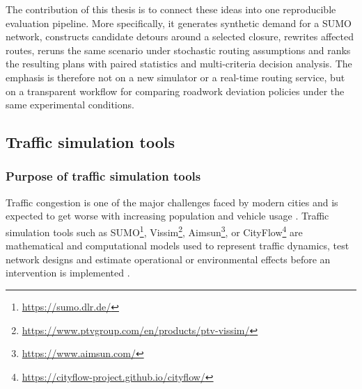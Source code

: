 The contribution of this thesis is to connect these ideas into one reproducible evaluation
pipeline. More specifically, it generates synthetic demand for a SUMO network, constructs candidate
detours around a selected closure, rewrites affected routes, reruns the same scenario under
stochastic routing assumptions and ranks the resulting plans with paired statistics and
multi-criteria decision analysis. The emphasis is therefore not on a new simulator or a real-time
routing service, but on a transparent workflow for comparing roadwork deviation policies under the
same experimental conditions.

\subsection{Traffic simulation tools}
\subsubsection{Purpose of traffic simulation tools}
Traffic congestion is one of the major challenges faced by modern cities and is expected to get
worse with increasing population and vehicle usage \cite{increasing_traffic,increasing_cars}.
Traffic simulation tools such as SUMO\footnote{\url{https://sumo.dlr.de/}}, Vissim\footnote{\url{https://www.ptvgroup.com/en/products/ptv-vissim/}}, Aimsun\footnote{\url{https://www.aimsun.com/}}, or CityFlow\footnote{\url{https://cityflow-project.github.io/cityflow/}} are mathematical and computational models used to represent traffic
dynamics, test network designs and estimate operational or environmental effects before an
intervention is implemented \cite{modelling_transport,SUMO_sumo}.


